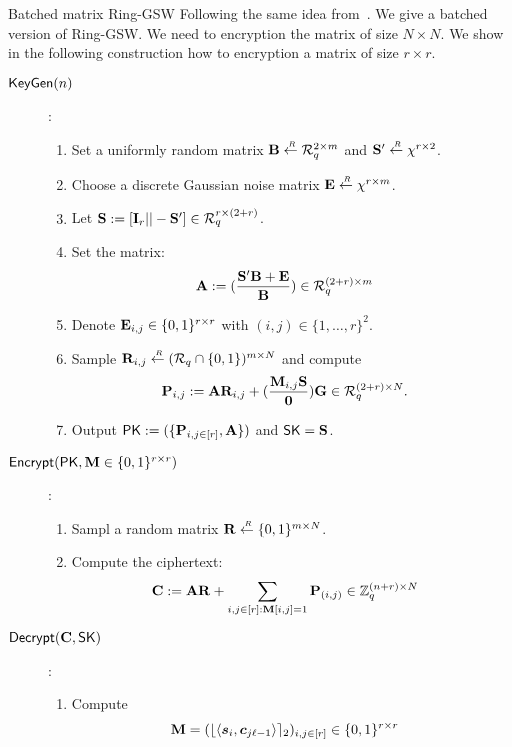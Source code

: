 \begin{subsection}{Batched matrix Ring-GSW}
  Following the same idea from~\cite{DBLP:conf/pkc/HiromasaAO15}. We give a batched version of Ring-GSW.
  We need to encryption the matrix of size $N \times N$.
  We show in the following construction how to encryption a matrix of size $r \times r$.
  \begin{description}
  \item[${\mathsf{KeyGen}}(n)$]:
    \begin{enumerate}
    \item Set a uniformly random matrix $\mathbf{B} \stackrel{{\scriptscriptstyle \mkern4mu R}}{\gets} {\mathcal{R}}_q^{2 \times m}$ and $\mathbf{S'} \stackrel{{\scriptscriptstyle \mkern4mu R}}{\gets} \chi^{r \times 2}$.
    \item Choose a discrete Gaussian noise matrix $\mathbf{E} \stackrel{{\scriptscriptstyle \mkern4mu R}}{\gets} \chi^{r \times m}$.
    \item Let $\mathbf{S}:= [\mathbf{I}_r || - \mathbf{S}'] \in {\mathcal{R}}_q^{r \times (2+r)}$.
    \item Set the matrix:
      \begin{align*}
        \mathbf{A} &:= (\frac{\mathbf{S}'\mathbf{B} + \mathbf{E}}{\mathbf{B}}) \in {\mathcal{R}}_q^{(2+r) \times m}
      \end{align*}
    \item Denote $\mathbf{E}_{i,j} \in \{0, 1\}^{r\times r}$ with $(i,j) \in \{1, \dots ,r\}^2$.
    \item Sample $\mathbf{R}_{i,j} \stackrel{{\scriptscriptstyle \mkern4mu R}}{\gets} ({\mathcal{R}}_q \cap \{0,1\})^{m \times N}$ and compute 
      \begin{align*}
        \mathbf{P}_{i,j} &:= \mathbf{A} \mathbf{R}_{i,j} + (\frac{\mathbf{M}_{i,j}\mathbf{S}}{\mathbf{0}}) \mathbf{G} \in {\mathcal{R}}_q^{(2+r) \times N}.
      \end{align*}
    \item Output $\mathsf{PK} := (\{\mathbf{P}_{i,j \in [r]}, \mathbf{A}\})$ and $\mathsf{SK} = \mathbf{S}$.
    \end{enumerate}
    
  \item[${\mathsf{Encrypt}}(\mathsf{PK}, \mathbf{M} \in \{0,1\}^{r \times r})$] :
    \begin{enumerate}
    \item Sampl a random matrix $\mathbf{R} \stackrel{{\scriptscriptstyle \mkern4mu R}}{\gets} \{0,1\}^{m \times N}$.
    \item Compute the ciphertext:
      \begin{align*}
        \mathbf{C} &:= \mathbf{A} \mathbf{R} + \sum_{i,j \in [r] : \mathbf{M}[i,j] = 1} \mathbf{P}_{(i,j)} \in \mathbb{Z}_q^{(n+r) \times N}
      \end{align*}
    \end{enumerate}
    
  \item[${\mathsf{Decrypt}}(\mathbf{C}, \mathsf{SK})$]:
    \begin{enumerate}
    \item Compute
      \begin{align*}
        \mat{M} &=(\round{\langle \vec{s}_i, \vec{c}_{j\ell-1} \rangle}_2)_{i,j \in [r]} \in \{0,1\}^{r \times r}
      \end{align*}
    \end{enumerate}
  \end{description}
\end{subsection}
